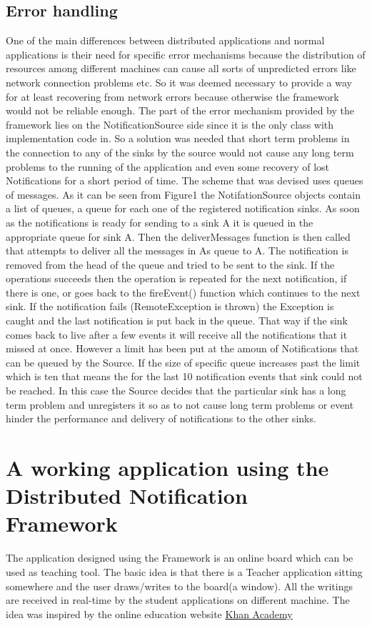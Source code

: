 \documentclass[a4paper,12pt,titlepage]{article}
\begin{document}
\subsection{Error handling}
One of the main differences between distributed applications and normal applications is their need for specific error mechanisms because the distribution of resources among different machines can cause all sorts of unpredicted errors like network connection problems etc. So it was deemed necessary to provide a way for at least recovering from network errors because otherwise the framework would not be reliable enough. The part of the error mechanism provided by the framework lies on the NotificationSource side since it is the only class with implementation code in. So a solution was needed that short term problems in the connection to any of the sinks by the source would not cause any long term problems to the running of the application and even some recovery of lost Notifications for a short period of time. The scheme that was devised uses queues of messages. As it can be seen from Figure1 the NotifationSource objects contain a list of queues, a queue for each one of the registered notification sinks. As soon as the notifications is ready for sending to a sink A it is queued in the appropriate queue for sink A. Then the deliverMessages function is then called that attempts to deliver all the messages in As queue to A.  The notification is removed from the head of the queue and tried to be sent to the sink. If the operations succeeds then the operation is repeated for the next notification, if there is one, or goes back to the fireEvent() function which continues to the next sink. If the notification fails (RemoteException is thrown) the Exception is caught and the last notification is put back in the queue. That way if the sink comes back to live after a few events it will receive all the notifications that it missed at once. However a limit has been put at the amoun of Notifications that can be queued by the Source. If the size of specific queue increases past the limit which is ten that means the for the last 10 notification events that sink could not be reached. In this case the Source decides that the particular sink has a long term problem and unregisters it so as to not cause long term problems or event hinder the performance and delivery of notifications to the other sinks. 
\section{A working application using the Distributed Notification Framework}
The application designed using the Framework is an online board which can be used as teaching tool. The basic idea is that there is a Teacher application sitting somewhere and the user draws/writes to the board(a window). All the writings are received in real-time by the student applications on different machine. The idea was inspired by the online education website \href{http://www.khanacademy.org/}{Khan Academy}
\end{document}
